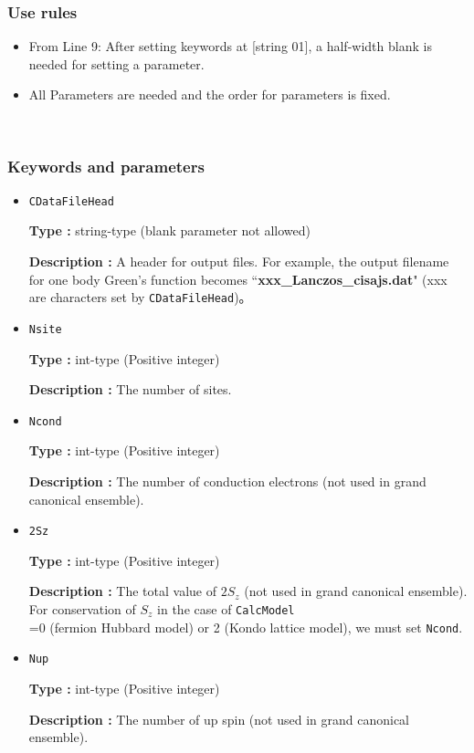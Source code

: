 \subsubsection{Use rules}
\begin{itemize}
\item From Line 9: After setting keywords at [string 01], a half-width blank is needed for setting a parameter.
\item All Parameters are needed and the order for parameters is fixed.
\end{itemize}

~\subsubsection{Keywords and parameters}
 \begin{itemize}
  \item  \verb|CDataFileHead|

 {\bf Type :} string-type (blank parameter not allowed)

{\bf Description :} A header for output files. For example, the output filename for one body Green's function becomes ``{\bf xxx\_Lanczos\_cisajs.dat}" (xxx are characters set by \verb|CDataFileHead|)。
   
 \item  \verb|Nsite|

{\bf Type :} int-type (Positive integer)

{\bf Description :} The number of sites.  


 \item  \verb|Ncond|

{\bf Type :} {int-type (Positive integer)}

{\bf Description :} {The number of conduction electrons (not used in grand canonical ensemble). }

 \item  \verb|2Sz|

{\bf Type :} {int-type (Positive integer)}

{\bf Description :} {The total value of $2S_z$ (not used in grand canonical ensemble). For conservation of $S_z$ in the case of } \verb|CalcModel| \\
 { =0 (fermion Hubbard model) or 2 (Kondo lattice model), we must set} \verb|Ncond|.

 \item  \verb|Nup|

{\bf Type :} int-type (Positive integer)

{\bf Description :} The number of up spin (not used in grand canonical ensemble). 


\end{itemize}
